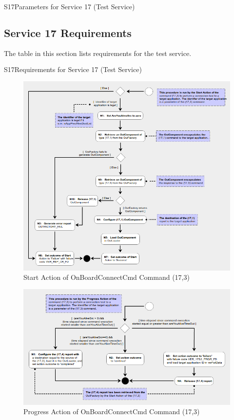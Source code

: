 \documentclass[a4paper,10pt]{article}
\newenvironment{cr_req}[2]
{
\begin{longtable}{|l|p{11.8cm}|}
\caption{#2}\label{tab:Req-#1} \\
\hline
\rowcolor{light-gray}
\textbf{Req. ID} & \textbf{Requirement Text}\\
\hline\hline
\endfirsthead
\rowcolor{light-gray}
\textbf{Req. ID} & \textbf{Requirement Text}\\
\hline\hline
\endhead
\DTLforeach*[\DTLiseq{\cat}{#1}]{dbReq}{\cat=Category,\type=Type,\id=Id,\reqText=Text}
{\DTLiffirstrow{}{\\\hline}P-\cat-\id/\type & \textit{\reqText}}\\\hline
}
{\end{longtable}}
\newenvironment{cr_par}[2]
{
\begin{longtable}{|l|p{9.5cm}|}
\caption{#2}\label{tab:Par-#1} \\
\hline
\rowcolor{light-gray}
\textbf{Name} & \textbf{Description}\\
\hline\hline
\endfirsthead
\rowcolor{light-gray}
\textbf{Name} & \textbf{Description}\\
\hline\hline
\endhead
\DTLforeach*[\DTLiseq{\cat}{#1}]{dbPar}{\cat=Category,\name=Name,\desc=Desc}
{\DTLiffirstrow{}{\\\hline}\texttt{\name} & \desc}\\\hline
}
{\end{longtable}}
\begin{document}
\begin{cr_par}{S17}{Parameters for Service 17 (Test Service)}
\end{cr_par}


\subsection{Service 17 Requirements}
The table in this section lists requirements for the test service.

\begin{cr_req}{S17}{Requirements for Service 17 (Test Service)}
\end{cr_req}

\newpage
\begin{figure}[H]
 \centering
 \includegraphics[scale=0.415,keepaspectratio=true]{CrPsCmd17s3Start.png}
 \caption{Start Action of OnBoardConnectCmd Command (17,3)}
 \label{fig:Cmd17s3Start}
\end{figure}

\begin{figure}[H]
 \centering
 \includegraphics[scale=0.415,keepaspectratio=true]{CrPsCmd17s3Prgr.png}
 \caption{Progress Action of OnBoardConnectCmd Command (17,3)}
 \label{fig:Cmd17s3Prgr}
\end{figure}
\end{document}
